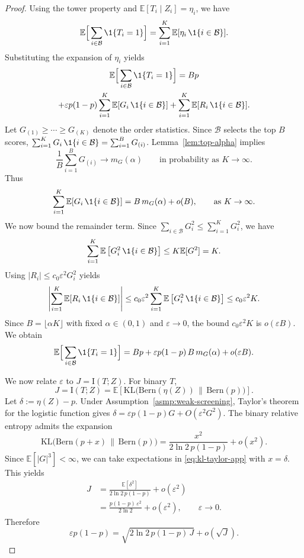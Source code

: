\documentclass[twocolumn]{scholar7}
\newcommand{\cB}{\mathcal{B}}
\newcommand{\E}{\mathbb{E}}
\newcommand{\KL}{\mathrm{KL}}
\newcommand{\I}{\mathrm{I}}
\newcommand{\abs}[1]{\left|#1\right|}
\newcommand{\bracks}[1]{\left[#1\right]}
\begin{document}
\begin{appendix}
\begin{proof}
Using the tower property and $\E[T_i\mid Z_i]=\eta_i$, we have
\[
\E\Big[\sum_{i\in\cB}\1\{T_i=1\}\Big]=\sum_{i=1}^K \E[\eta_i\,\1\{i\in\cB\}].
\]
Substituting the expansion of $\eta_i$ yields
\begin{multline*}
\E\Big[\sum_{i\in\cB}\1\{T_i=1\}\Big]
=
Bp  \\ 
+ \varepsilon p(1-p)\sum_{i=1}^K \E[G_i\,\1\{i\in\cB\}]  + \sum_{i=1}^K \E[R_i\,\1\{i\in\cB\}].
\end{multline*}
Let $G_{(1)}\ge\cdots\ge G_{(K)}$ denote the order statistics.
Since $\cB$ selects the top $B$ scores, $\sum_{i=1}^K G_i\,\1\{i\in\cB\}=\sum_{i=1}^B G_{(i)}$.
Lemma~\ref{lem:top-alpha} implies
\[
\frac{1}{B}\sum_{i=1}^B G_{(i)}\to m_G(\alpha)
\qquad\text{in probability as }K\to\infty.
\]
Thus
\[
\sum_{i=1}^K \E[G_i\,\1\{i\in\cB\}] = B\,m_G(\alpha)+o(B),
\qquad\text{as }K\to\infty.
\]
We now bound the remainder term.
Since $\sum_{i\in\cB} G_i^2\le \sum_{i=1}^K G_i^2$, we have
\[
\sum_{i=1}^K \E\bracks{G_i^2\,\1\{i\in\cB\}}\le K\E[G^2]=K.
\]
Using $\abs{R_i}\le c_0\varepsilon^2 G_i^2$ yields
\[
\abs{\sum_{i=1}^K \E[R_i\,\1\{i\in\cB\}]}
\le
c_0\varepsilon^2\sum_{i=1}^K \E\bracks{G_i^2\,\1\{i\in\cB\}}
\le
c_0\varepsilon^2 K.
\]
Since $B=\lfloor \alpha K\rfloor$ with fixed $\alpha\in(0,1)$ and $\varepsilon\to 0$, the bound $c_0\varepsilon^2 K$ is $o(\varepsilon B)$.
We obtain
\begin{equation}
\label{eq:exp-inf-app}
\E\Big[\sum_{i\in\cB}\1\{T_i=1\}\Big]
=
Bp + \varepsilon p(1-p)\,B\,m_G(\alpha)+o(\varepsilon B).
\end{equation}

We now relate $\varepsilon$ to $J=\I(T;Z)$.
For binary $T$,
\[
J=\I(T;Z)=\E\bracks{\KL\big(\mathrm{Bern}(\eta(Z))\,\|\,\mathrm{Bern}(p)\big)}.
\]
Let $\delta:=\eta(Z)-p$.
Under Assumption~\ref{asmp:weak-screening}, Taylor's theorem for the logistic function gives
$\delta=\varepsilon p(1-p)G+O(\varepsilon^2 G^2)$.
The binary relative entropy admits the expansion
\begin{equation}
\label{eq:kl-taylor-app}
\KL\big(\mathrm{Bern}(p+x)\,\|\,\mathrm{Bern}(p)\big)
=
\frac{x^2}{2\ln 2\,p(1-p)}+o(x^2).
\end{equation}
Since $\E[\abs{G}^3]<\infty$, we can take expectations in \eqref{eq:kl-taylor-app} with $x=\delta$.
This yields
\[
\begin{aligned}
J
&=\frac{\E[\delta^2]}{2\ln 2\,p(1-p)}+o(\varepsilon^2)\\
&=\frac{p(1-p)\,\varepsilon^2}{2\ln 2}+o(\varepsilon^2),
\qquad \varepsilon\to 0.
\end{aligned}
\]
Therefore
\[
\varepsilon p(1-p)=\sqrt{2\ln 2\,p(1-p)\,J}+o(\sqrt{J}).
\]


\end{proof}
\end{appendix}
\end{document}
